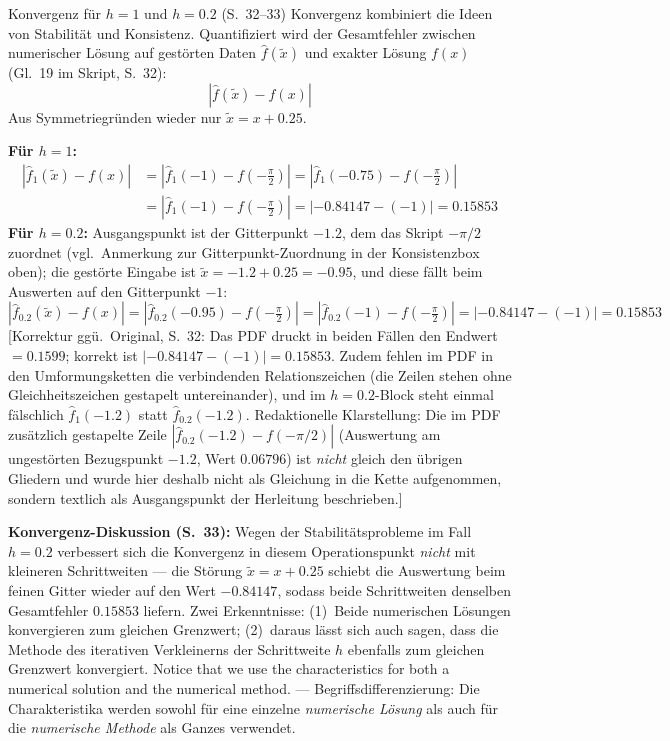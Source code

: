 \begin{bspbox}{Konvergenz für $h=1$ und $h=0.2$ (S.~32--33)}
Konvergenz kombiniert die Ideen von Stabilität und Konsistenz. Quantifiziert wird der Gesamtfehler zwischen numerischer Lösung auf gestörten Daten $\hat{f}(\tilde{x})$ und exakter Lösung $f(x)$ (Gl.~19 im Skript, S.~32):
\[ \left| \hat{f}(\tilde{x}) - f(x) \right| \tag{Gl.~19} \]
Aus Symmetriegründen wieder nur $\tilde{x} = x + 0.25$.

\textbf{Für $h=1$:}
\begin{align*}
\left| \hat{f}_1(\tilde{x}) - f(x) \right| &= \left| \hat{f}_1(-1) - f\!\left(-\tfrac{\pi}{2}\right) \right| = \left| \hat{f}_1(-0.75) - f\!\left(-\tfrac{\pi}{2}\right) \right| \\
&= \left| \hat{f}_1(-1) - f\!\left(-\tfrac{\pi}{2}\right) \right| = |-0.84147 - (-1)| = 0.15853
\end{align*}
\textbf{Für $h=0.2$:} Ausgangspunkt ist der Gitterpunkt $-1.2$, dem das Skript $-\pi/2$ zuordnet (vgl.\ Anmerkung zur Gitterpunkt-Zuordnung in der Konsistenzbox oben); die gestörte Eingabe ist $\tilde{x} = -1.2 + 0.25 = -0.95$, und diese fällt beim Auswerten auf den Gitterpunkt $-1$:
\[
\left| \hat{f}_{0.2}(\tilde{x}) - f(x) \right| = \left| \hat{f}_{0.2}(-0.95) - f\!\left(-\tfrac{\pi}{2}\right) \right| = \left| \hat{f}_{0.2}(-1) - f\!\left(-\tfrac{\pi}{2}\right) \right| = |-0.84147 - (-1)| = 0.15853
\]
[Korrektur ggü.\ Original, S.~32: Das PDF druckt in beiden Fällen den Endwert \glqq$= 0.1599$\grqq; korrekt ist $|-0.84147 - (-1)| = 0.15853$. Zudem fehlen im PDF in den Umformungsketten die verbindenden Relationszeichen (die Zeilen stehen ohne Gleichheitszeichen gestapelt untereinander), und im $h=0.2$-Block steht einmal fälschlich $\hat{f}_1(-1.2)$ statt $\hat{f}_{0.2}(-1.2)$. Redaktionelle Klarstellung: Die im PDF zusätzlich gestapelte Zeile $|\hat{f}_{0.2}(-1.2) - f(-\pi/2)|$ (Auswertung am ungestörten Bezugspunkt $-1.2$, Wert $0.06796$) ist \emph{nicht} gleich den übrigen Gliedern und wurde hier deshalb nicht als Gleichung in die Kette aufgenommen, sondern textlich als Ausgangspunkt der Herleitung beschrieben.]

\textbf{Konvergenz-Diskussion (S.~33):} Wegen der Stabilitätsprobleme im Fall $h=0.2$ verbessert sich die Konvergenz in diesem Operationspunkt \emph{nicht} mit kleineren Schrittweiten — die Störung $\tilde{x} = x + 0.25$ schiebt die Auswertung beim feinen Gitter wieder auf den Wert $-0.84147$, sodass beide Schrittweiten denselben Gesamtfehler $0.15853$ liefern. Zwei Erkenntnisse: (1)~Beide numerischen Lösungen konvergieren zum gleichen Grenzwert; (2)~daraus lässt sich auch sagen, dass die Methode des iterativen Verkleinerns der Schrittweite $h$ ebenfalls zum gleichen Grenzwert konvergiert. \glqq Notice that we use the characteristics for both a numerical solution and the numerical method.\grqq{} — Begriffsdifferenzierung: Die Charakteristika werden sowohl für eine einzelne \emph{numerische Lösung} als auch für die \emph{numerische Methode} als Ganzes verwendet.
\end{bspbox}


